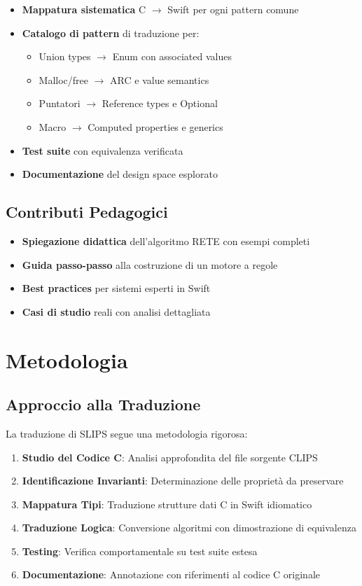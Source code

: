 \begin{itemize}
\item \textbf{Mappatura sistematica} C $\to$ Swift per ogni pattern comune
\item \textbf{Catalogo di pattern} di traduzione per:
  \begin{itemize}
  \item Union types $\to$ Enum con associated values
  \item Malloc/free $\to$ ARC e value semantics
  \item Puntatori $\to$ Reference types e Optional
  \item Macro $\to$ Computed properties e generics
  \end{itemize}
\item \textbf{Test suite} con equivalenza verificata
\item \textbf{Documentazione} del design space esplorato
\end{itemize}

\subsection{Contributi Pedagogici}

\begin{itemize}
\item \textbf{Spiegazione didattica} dell'algoritmo RETE con esempi completi
\item \textbf{Guida passo-passo} alla costruzione di un motore a regole
\item \textbf{Best practices} per sistemi esperti in Swift
\item \textbf{Casi di studio} reali con analisi dettagliata
\end{itemize}

\section{Metodologia}

\subsection{Approccio alla Traduzione}

La traduzione di SLIPS segue una metodologia rigorosa:

\begin{enumerate}
\item \textbf{Studio del Codice C}: Analisi approfondita del file sorgente CLIPS
\item \textbf{Identificazione Invarianti}: Determinazione delle proprietà da preservare
\item \textbf{Mappatura Tipi}: Traduzione strutture dati C in Swift idiomatico
\item \textbf{Traduzione Logica}: Conversione algoritmi con dimostrazione di equivalenza
\item \textbf{Testing}: Verifica comportamentale su test suite estesa
\item \textbf{Documentazione}: Annotazione con riferimenti al codice C originale
\end{enumerate}

